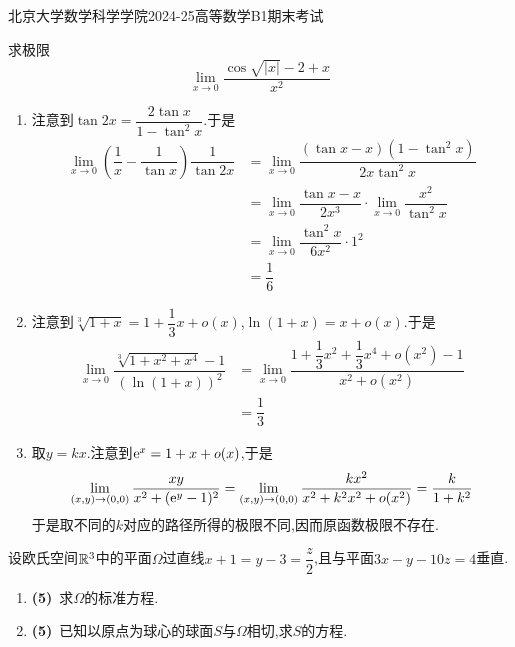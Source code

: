 \documentclass{ctexart}
\begin{document}
\pagestyle{empty}
\begin{center}\Large
    北京大学数学科学学院2024-25高等数学B1期末考试
\end{center}
\begin{problem}[1.(15\songti{分})]
    求极限
    \[\lim_{x\to0}\dfrac{\cos\sqrt{|x|}-2+x}{x^2}\]
\end{problem}
\begin{solution}
    \begin{enumerate}[label=\tbf{(\arabic*)}]
        \item 注意到$\tan 2x=\dfrac{2\tan x}{1-\tan^2x}$.于是
            \[\begin{aligned}
                \lim_{x\to0}\left(\dfrac{1}{x}-\dfrac{1}{\tan x}\right)\dfrac{1}{\tan2x}
                &= \lim_{x\to0}\dfrac{(\tan x-x)(1-\tan^2x)}{2x\tan^2 x} \\
                &= \lim_{x\to0}\dfrac{\tan x-x}{2x^3}\cdot\lim_{x\to0}\dfrac{x^2}{\tan^2x} \\
                &= \lim_{x\to0}\dfrac{\tan^2x}{6x^2}\cdot1^2\\
                &= \dfrac16
            \end{aligned}\]
        \item 注意到$\sqrt[3]{1+x}=1+\dfrac13x+o(x)$,$\ln(1+x)=x+o(x)$.于是
            \[\begin{aligned}
                \lim_{x\to0}\dfrac{\sqrt[3]{1+x^2+x^4}-1}{\left(\ln(1+x)\right)^2}
                &= \lim_{x\to0}\dfrac{1+\dfrac13x^2+\dfrac13x^4+o(x^2)-1}{x^2+o(x^2)} \\
                &= \dfrac13
            \end{aligned}\]
        \item 取$y=kx$.注意到$\mathrm{e}^x=1+x+o(x)$,于是
            \[\lim_{(x,y)\to(0,0)}\dfrac{xy}{x^2+(\mathrm{e}^y-1)^2}=\lim_{(x,y)\to(0,0)}\dfrac{kx^2}{x^2+k^2x^2+o(x^2)}=\dfrac{k}{1+k^2}\]
            于是取不同的$k$对应的路径所得的极限不同,因而原函数极限不存在.
    \end{enumerate}
\end{solution}
\begin{problem}[2.(10\songti{分})]
    设欧氏空间$\mathbb{R}^3$中的平面$\Omega$过直线$x+1=y-3=\dfrac{z}2$,且与平面$3x-y-10z=4$垂直.
    \begin{enumerate}[label=\tbf{(\arabic*)}]
        \item \textbf{(5)}\ 求$\Omega$的标准方程.
        \item \textbf{(5)}\ 已知以原点为球心的球面$S$与$\Omega$相切,求$S$的方程.
    \end{enumerate}
\end{problem}
\end{document}
